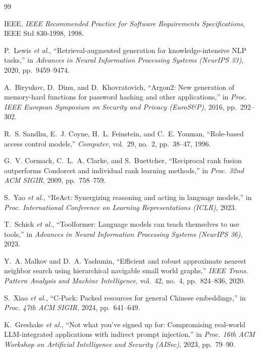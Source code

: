 \documentclass[11pt,a4paper,oneside]{report}
\begin{document}
\renewcommand{\bibname}{References}
\begin{thebibliography}{99}

IEEE, \emph{IEEE Recommended Practice for Software Requirements Specifications}, IEEE Std
830-1998, 1998.

P.~Lewis \emph{et al.}, ``Retrieval-augmented generation for knowledge-intensive NLP
tasks,'' in \emph{Advances in Neural Information Processing Systems (NeurIPS 33)}, 2020,
pp.~9459--9474.

A.~Biryukov, D.~Dinu, and D.~Khovratovich, ``Argon2: New generation of memory-hard functions
for password hashing and other applications,'' in \emph{Proc. IEEE European Symposium on
Security and Privacy (EuroS\&P)}, 2016, pp.~292--302.

R.~S. Sandhu, E.~J. Coyne, H.~L. Feinstein, and C.~E. Youman, ``Role-based access control
models,'' \emph{Computer}, vol.~29, no.~2, pp.~38--47, 1996.

G.~V. Cormack, C.~L.~A. Clarke, and S.~Buettcher, ``Reciprocal rank fusion outperforms
Condorcet and individual rank learning methods,'' in \emph{Proc. 32nd ACM SIGIR}, 2009,
pp.~758--759.

S.~Yao \emph{et al.}, ``ReAct: Synergizing reasoning and acting in language models,'' in
\emph{Proc. International Conference on Learning Representations (ICLR)}, 2023.

T.~Schick \emph{et al.}, ``Toolformer: Language models can teach themselves to use tools,''
in \emph{Advances in Neural Information Processing Systems (NeurIPS 36)}, 2023.

Y.~A. Malkov and D.~A. Yashunin, ``Efficient and robust approximate nearest neighbor search
using hierarchical navigable small world graphs,'' \emph{IEEE Trans. Pattern Analysis and
Machine Intelligence}, vol.~42, no.~4, pp.~824--836, 2020.

S.~Xiao \emph{et al.}, ``C-Pack: Packed resources for general Chinese embeddings,'' in
\emph{Proc. 47th ACM SIGIR}, 2024, pp.~641--649.

K.~Greshake \emph{et al.}, ``Not what you've signed up for: Compromising real-world
LLM-integrated applications with indirect prompt injection,'' in \emph{Proc. 16th ACM
Workshop on Artificial Intelligence and Security (AISec)}, 2023, pp.~79--90.


\end{thebibliography}
\end{document}
